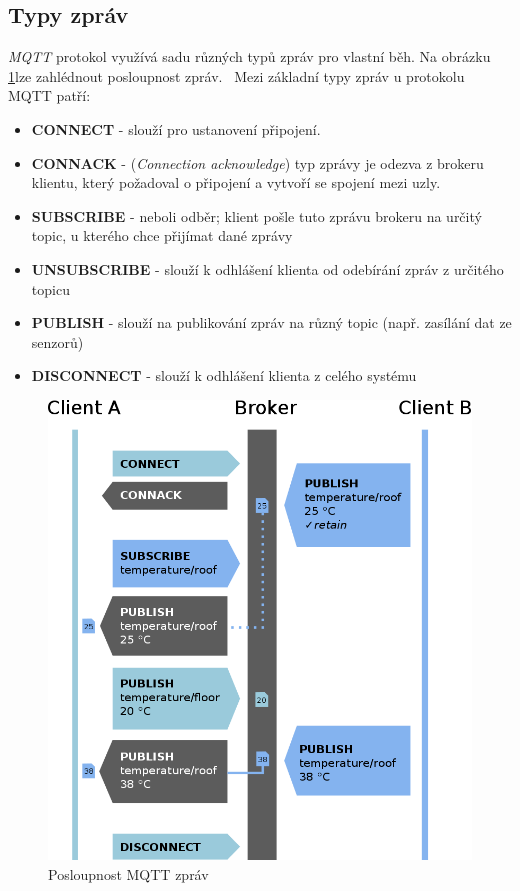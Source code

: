 \newpage
\subsection{Typy zpráv}
\emph{MQTT} protokol využívá sadu různých typů zpráv pro vlastní běh. Na obrázku \ref{figure:mqtt_flow}lze zahlédnout posloupnost zpráv.~\cite{wiki:mqtt_broker}
Mezi základní typy zpráv u protokolu MQTT patří:
\begin{itemize}
  \item \textbf{CONNECT} - slouží pro ustanovení připojení.
  \item \textbf{CONNACK} - (\emph{Connection acknowledge}) typ zprávy je odezva z brokeru klientu, který požadoval o připojení a vytvoří se spojení mezi uzly.
  \item \textbf{SUBSCRIBE} - neboli odběr; klient pošle tuto zprávu brokeru na určitý topic, u kterého chce přijímat dané zprávy
  \item \textbf{UNSUBSCRIBE} - slouží k odhlášení klienta od odebírání zpráv z určitého topicu
  \item \textbf{PUBLISH} - slouží na publikování zpráv na různý topic (např. zasílání dat ze senzorů)
  \item \textbf{DISCONNECT} - slouží k odhlášení klienta z celého systému
\end{itemize}

\begin{figure}[ht]
  \centering
  \includegraphics[width=.7 \linewidth]{obrazky-figures/mqtt_flow.png}
  \caption{Posloupnost MQTT zpráv}
  \label{figure:mqtt_flow}
\end{figure}


